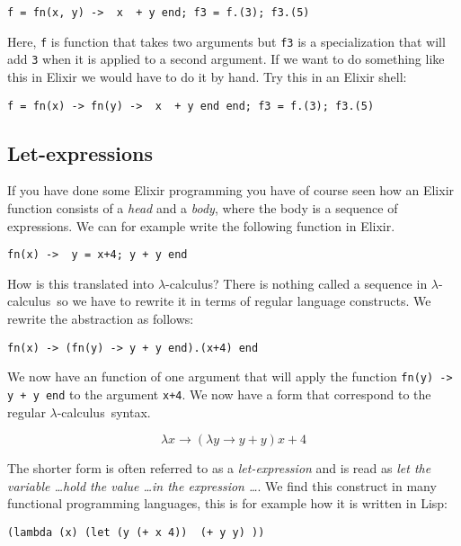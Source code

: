 \documentclass[a4paper,11pt]{article}
\newcommand{\lamc}[0]{$\lambda$-calculus}
\begin{document}
\begin{verbatim}
f = fn(x, y) ->  x  + y end; f3 = f.(3); f3.(5)
\end{verbatim}

Here, {\tt f} is function that takes two arguments but {\tt f3} is a
specialization that will add {\tt 3} when it is applied to a second
argument. If we want to do something like this in Elixir we would have
to do it by hand. Try this in an Elixir shell:

\begin{verbatim}
f = fn(x) -> fn(y) ->  x  + y end end; f3 = f.(3); f3.(5)
\end{verbatim}


\subsection{Let-expressions}   

If you have done some Elixir programming you have of course seen how
an Elixir function consists of a {\em head} and a {\em body}, where the
body is a sequence of expressions. We can for example write the
following function in Elixir.

\begin{verbatim}
fn(x) ->  y = x+4; y + y end
\end{verbatim}

How is this translated into \lamc? There is nothing called a sequence
in \lamc\ so we have to rewrite it in terms of regular language
constructs. We rewrite the abstraction as follows:

\begin{verbatim}
fn(x) -> (fn(y) -> y + y end).(x+4) end
\end{verbatim}

We now have an function of one argument that will apply the
function {\tt fn(y) -> y + y end} to the argument {\tt x+4}.  We
now have a form that correspond to the regular \lamc\ syntax.

$$\lambda x \rightarrow (\lambda y \rightarrow y + y) x+4$$

The shorter form is often referred to as a {\em let-expression} and is
read as {\em let the variable \ldots hold the value \ldots in the
  expression \ldots}. We find this construct in many functional
programming languages, this is for example how it is written in Lisp:

\begin{verbatim}
(lambda (x) (let (y (+ x 4))  (+ y y) ))
\end{verbatim}
\end{document}
